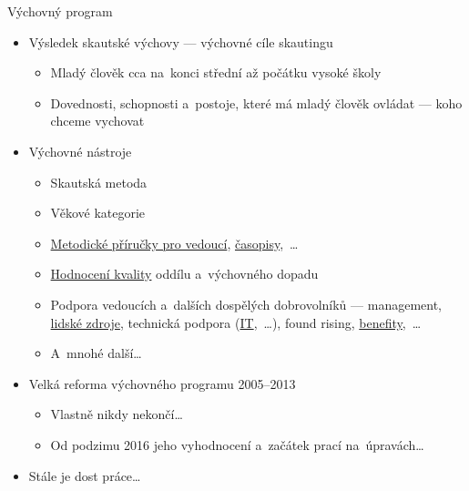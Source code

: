\documentclass[compress, xelatex, 11pt, xcolor=dvipsnames, aspectratio=169, url={hyphens, lowtilde}]{beamer}
\begin{document}
\begin{frame}{Výchovný program}
	\begin{itemize}
		\item Výsledek skautské výchovy --- výchovné cíle skautingu
		\begin{itemize}
			\item Mladý člověk cca na~konci střední až počátku vysoké školy
			\item Dovednosti, schopnosti a~postoje, které má mladý člověk ovládat --- koho chceme vychovat
		\end{itemize}
		\item Výchovné nástroje
		\begin{itemize}
			\item Skautská metoda
			\item Věkové kategorie
			\item \href{https://casopisy.skaut.cz/knihovna/r/metodika}{Metodické příručky pro vedoucí}, \href{https://casopisy.skaut.cz/}{časopisy},~\ldots
			\item \href{https://krizovatka.skaut.cz/fungujici-tym/zpetna-vazba-je-dulezita}{Hodnocení kvality} oddílu a~výchovného dopadu
			\item Podpora vedoucích a~dalších dospělých dobrovolníků --- management, \href{https://krizovatka.skaut.cz/organizace/ustredni-organy/odbory-vykonne-rady/odbor-pro-personalistiku}{lidské zdroje}, technická podpora (\href{https://krizovatka.skaut.cz/organizace/ustredni-organy/odbory-vykonne-rady/infoodbor}{IT},~\ldots), found rising, \href{https://krizovatka.skaut.cz/skautske-benefity}{benefity},~\ldots
			\item A~mnohé další\ldots
		\end{itemize}
		\item Velká reforma výchovného programu 2005--2013
		\begin{itemize}
			\item Vlastně nikdy nekončí\ldots
			\item Od podzimu 2016 jeho vyhodnocení a~začátek prací na~úpravách\ldots
		\end{itemize}
		\item Stále je dost práce\ldots
	\end{itemize}
\end{frame}
\end{document}
